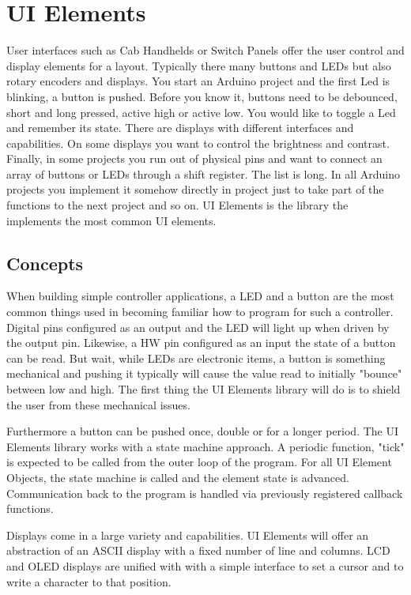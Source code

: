 \chapter{UI Elements}

User interfaces such as Cab Handhelds or Switch Panels offer the user control and display elements for a layout. Typically there many buttons and LEDs but also rotary encoders and displays. You start an Arduino project and the first Led is blinking, a button is pushed. Before you know it, buttons need to be debounced, short and long pressed, active high or active low. You would like to toggle a Led and remember its state. There are displays with different interfaces and capabilities. On some displays you want to control the brightness and contrast. Finally, in some projects you run out of physical pins and want to connect an array of buttons or LEDs through a shift register. The list is long. In all Arduino projects you implement it somehow directly in project just to take part of the functions to the next project and so on. UI Elements is the library the implements the most common UI elements.

\section{Concepts}

When building simple controller applications, a LED and a button are the most common things used in becoming familiar how to program for such a controller. Digital pins configured as an output and the LED will light up when driven by the output pin. Likewise, a HW pin configured as an input the state of a button can be read. But wait, while LEDs are electronic items, a button is something mechanical and pushing it typically will cause the value read to initially "bounce" between low and high. The first thing the UI Elements library will do is to shield the user from these mechanical issues.

Furthermore a button can be pushed once, double or for a longer period. The UI Elements library works with a state machine approach. A periodic function, "tick" is expected to be called from the outer loop of the program. For all UI Element Objects, the state machine is called and the element state is advanced. Communication back to the program is handled via previously registered callback functions.

Displays come in a large variety and capabilities. UI Elements will offer an abstraction of an ASCII display with a fixed number of line and columns. LCD and OLED displays are unified with with a simple interface to set a cursor and to write a character to that position.

